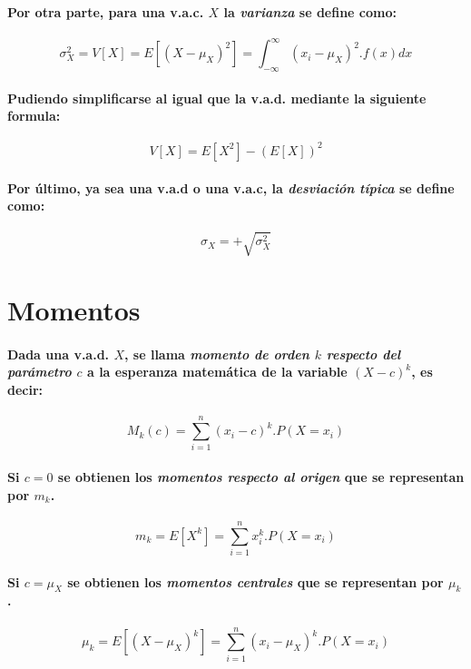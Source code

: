 \paragraph{
Por otra parte, para una v.a.c. $X$ la \emph{varianza} se define como:
}
\begin{equation}
\sigma_X^2 = V[X] = E[(X - \mu_X)^2] = \int_{-\infty}^\infty(x_i - \mu_X)^2.f(x) dx
\end{equation}
\paragraph{
Pudiendo simplificarse al igual que la v.a.d. mediante la siguiente formula:
}
\begin{equation}
V[X] = E[X^2] - (E[X])^2
\end{equation}
\paragraph{
Por último, ya sea una v.a.d o una v.a.c, la \emph{desviación típica} se define como: 
}
\begin{equation}
\sigma_X = +\sqrt{\sigma_X^2}
\end{equation}



\section{Momentos}
\paragraph{
Dada una v.a.d. $X$, se llama \emph{momento de orden $k$ respecto del parámetro $c$} a la esperanza matemática de la variable $(X - c)^k$, es decir:
}
\begin{equation}
M_k(c) = \sum_{i=1}^n (x_i - c)^k . P(X = x_i)
\end{equation}
\paragraph{
Si $c = 0$ se obtienen los \emph{momentos respecto al origen} que se representan por $m_k$.
}
\begin{equation}
m_k = E[X^k] = \sum_{i=1}^n x_i^k . P(X=x_i)
\end{equation}
\paragraph{
Si $c = \mu_X$ se obtienen los \emph{momentos centrales} que se representan por $\mu_k$.
}
\begin{equation}
\mu_k = E[(X-\mu_X)^k] = \sum_{i=1}^n (x_i - \mu_X)^k . P(X = x_i)
\end{equation}

